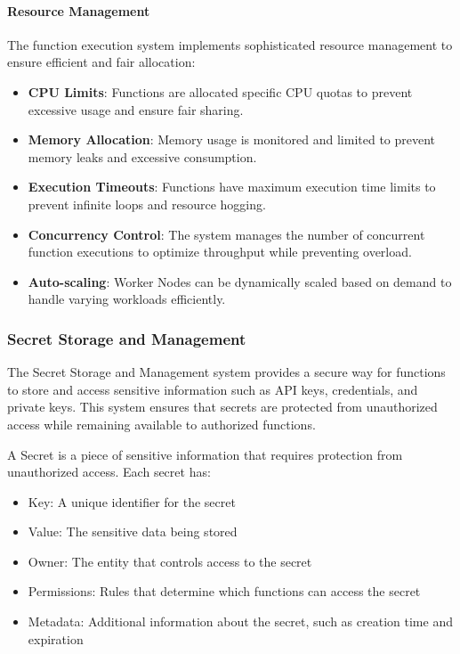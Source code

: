 \paragraph{Resource Management}
The function execution system implements sophisticated resource management to ensure efficient and fair allocation:

\begin{itemize}
    \item \textbf{CPU Limits}: Functions are allocated specific CPU quotas to prevent excessive usage and ensure fair sharing.
    
    \item \textbf{Memory Allocation}: Memory usage is monitored and limited to prevent memory leaks and excessive consumption.
    
    \item \textbf{Execution Timeouts}: Functions have maximum execution time limits to prevent infinite loops and resource hogging.
    
    \item \textbf{Concurrency Control}: The system manages the number of concurrent function executions to optimize throughput while preventing overload.
    
    \item \textbf{Auto-scaling}: Worker Nodes can be dynamically scaled based on demand to handle varying workloads efficiently.
\end{itemize}

\subsubsection{Secret Storage and Management}
\label{subsubsec:secret-storage}

The Secret Storage and Management system provides a secure way for functions to store and access sensitive information such as API keys, credentials, and private keys. This system ensures that secrets are protected from unauthorized access while remaining available to authorized functions.



\begin{definition}[Secret]
A Secret is a piece of sensitive information that requires protection from unauthorized access. Each secret has:
\begin{itemize}
    \item Key: A unique identifier for the secret
    \item Value: The sensitive data being stored
    \item Owner: The entity that controls access to the secret
    \item Permissions: Rules that determine which functions can access the secret
    \item Metadata: Additional information about the secret, such as creation time and expiration
\end{itemize}
\end{definition}

